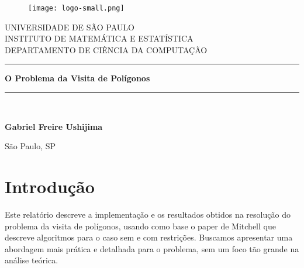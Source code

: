 \documentclass{article}
\begin{document}
\begin{titlepage}

\begin{center}
	
	\begin{figure}[H]
		\centering
		\texttt{[image: logo-small.png]} %
	\end{figure}

	\vspace{2cm}

	{\Large \sc UNIVERSIDADE DE SÃO PAULO} \\
	{\Large \sc INSTITUTO DE MATEMÁTICA E ESTATÍSTICA} \\ [0.7cm]
	{\sc DEPARTAMENTO DE CIÊNCIA DA COMPUTAÇÃO} \\

	\vspace{2cm}

	\rule{\linewidth}{2pt}
	
	\vspace{0.2em} %
	{\Large \bfseries 
		O Problema da Visita de Polígonos \\
	}
	\vspace{0.2em} %
	
	\rule{\linewidth}{2pt} \\

\end{center}

\vspace{2.8cm}

\begin{center}
	{\large \bfseries Gabriel Freire Ushijima} \\
\end{center}

\vfill

\begin{center}
	\makeatletter
	{\large São Paulo, SP \\
	\@date}
	\makeatother
\end{center}

\end{titlepage}

\newpage

\section{Introdução}

Este relatório descreve a implementação e os resultados obtidos na resolução do problema da visita de polígonos, usando como base o paper de Mitchell \cite{mitchell2003} que descreve algoritmos para o caso sem e com restrições. Buscamos apresentar uma abordagem mais prática e detalhada para o problema, sem um foco tão grande na análise teórica.
\end{document}
